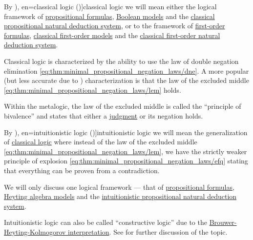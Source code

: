 \begin{definition}\label{def:classical_logic}
  By \term[ru=классическая логика (\cite[58]{ШеньВерещагин2017Языки}), en=classical logic (\cite[8]{TroelstraSchwichtenberg2000})]{classical logic} we will mean either the logical framework of \hyperref[def:propositional_syntax/formula]{propositional formulas}, \hyperref[def:propositional_model]{Boolean models} and the \hyperref[def:classical_propositional_deductive_system]{classical propositional natural deduction system}, or to the framework of \hyperref[def:first_order_syntax/formula]{first-order formulas}, \hyperref[def:first_order_model]{classical first-order models} and the \hyperref[def:first_order_natural_deduction_system]{classical first-order natural deduction system}.

  Classical logic is characterized by the ability to use the law of double negation elimination \eqref{eq:thm:minimal_propositional_negation_laws/dne}. A more popular (but less accurate due to ) characterization is that the law of the excluded middle \eqref{eq:thm:minimal_propositional_negation_laws/lem} holds.
\end{definition}
\begin{comments}
  \item Within the metalogic, the law of the excluded middle is called the \enquote{principle of bivalence} and states that either a \hyperref[def:judgment]{judgment} or its negation holds.
\end{comments}

\begin{remark}\label{def:intuitionistic_logic}
  By \term[ru=интуиционисткая логика (\cite[58]{ШеньВерещагин2017Языки}), en=intuitionistic logic (\cite[8]{TroelstraSchwichtenberg2000})]{intuitionistic logic} we will mean the generalization of \hyperref[def:classical_logic]{classical logic} where instead of the law of the excluded middle \eqref{eq:thm:minimal_propositional_negation_laws/lem}, we have the strictly weaker principle of explosion \eqref{eq:thm:minimal_propositional_negation_laws/efq} stating that everything can be proven from a contradiction.

  We will only discuss one logical framework --- that of \hyperref[def:propositional_formula]{propositional formulas}, \hyperref[def:propositional_heyting_algebra_semantics]{Heyting algebra models} and the \hyperref[def:intuitionistic_propositional_deductive_systems]{intuitionistic propositional natural deduction system}.
\end{remark}
\begin{comments}
  \item Intuitionistic logic can also be called \enquote{constructive logic} due to the \hyperref[rem:brouwer_heyting_kolmogorov_interpretation]{Brouwer-Heyting-Kolmogorov interpretation}. See  for further discussion of the topic.
\end{comments}

